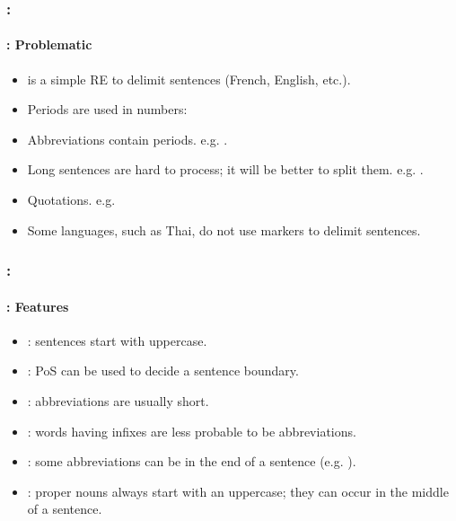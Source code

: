 \documentclass[xcolor=table]{beamer}
\begin{document}
\begin{frame}
	\frametitle{\insertshortsubtitle: \insertsection}
	\framesubtitle{\insertsubsection: Problematic} 

	\begin{itemize}
		\item \expword{/[.?!]/} is a simple RE to delimit sentences (French, English, etc.).
		\item Periods are used in numbers: 
		\item Abbreviations contain periods. e.g. .
		\item Long sentences are hard to process; it will be better to split them. e.g. .
		\item Quotations. e.g. 
		\item Some languages, such as Thai, do not use markers to delimit sentences.
	\end{itemize}

\end{frame}

\begin{frame}
	\frametitle{\insertshortsubtitle: \insertsection}
	\framesubtitle{\insertsubsection: Features} 

	\begin{itemize}
		\item {}: sentences start with uppercase.
		\item {}: PoS can be used to decide a sentence boundary.
		\item {}: abbreviations are usually short.
		\item {}: words having infixes are less probable to be abbreviations.
		\item {}: some abbreviations can be in the end of a sentence (e.g. ).
		\item {}: proper nouns always start with an uppercase; they can occur in the middle of a sentence.
	\end{itemize}

\end{frame}
\end{document}
